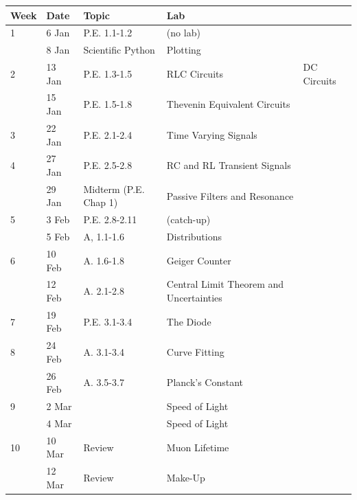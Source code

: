 \documentclass[12pt]{article}
\begin{document}
\begin{table}[h!]
\normalsize %
\begin{tabular}{ lllll }
\hline
\textbf{Week} & \textbf{Date} & \textbf{Topic} & \textbf{Lab} \\
\hline
1 & 6 Jan & P.E. 1.1-1.2 & (no lab) \\
   & 8 Jan & Scientific Python & Plotting\\
\hline
2 & 13 Jan & P.E. 1.3-1.5 & RLC Circuits & DC Circuits \\
  & 15 Jan & P.E. 1.5-1.8 & Thevenin Equivalent Circuits \\
\hline
3 & 22 Jan & P.E. 2.1-2.4 & Time Varying Signals \\
\hline
4 & 27 Jan & P.E. 2.5-2.8 & RC and RL Transient Signals \\
  & 29 Jan & Midterm (P.E. Chap 1) & Passive Filters and Resonance \\
\hline
5 & 3 Feb & P.E. 2.8-2.11 & (catch-up) \\
  & 5 Feb & A, 1.1-1.6 & Distributions \\
\hline
6 & 10 Feb & A. 1.6-1.8  & Geiger Counter \\
  & 12 Feb & A. 2.1-2.8 & Central Limit Theorem and Uncertainties \\
\hline
7 & 19 Feb & P.E. 3.1-3.4 & The Diode\\
\hline
8 & 24 Feb & A. 3.1-3.4 & Curve Fitting \\
  & 26 Feb & A. 3.5-3.7 & Planck's Constant \\
\hline
9 & 2 Mar & & Speed of Light \\
  & 4 Mar & & Speed of Light \\
\hline
10 & 10 Mar & Review & Muon Lifetime\\
   & 12 Mar & Review & Make-Up \\
\hline
\end{tabular} 
\end{table}
\end{document}
